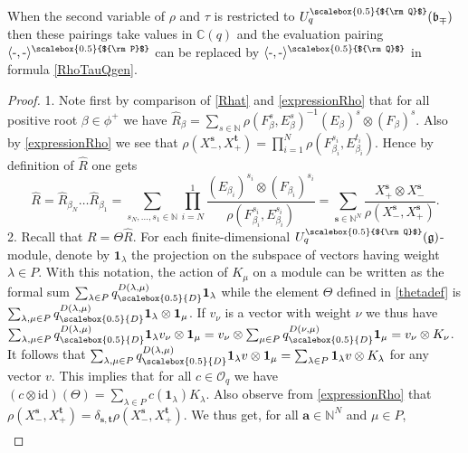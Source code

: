 \documentclass[11pt]{amsart}
\newcommand{\mc}{\mathbb{C}}
\newcommand{\qD}{q_{\scalebox{0.5}{D}}}
\newcommand{\Q}{{\scalebox{0.5}{${\rm Q}$}}}
\newcommand{\Pup}{{\scalebox{0.5}{${\rm P}$}}}
\begin{document}
\noindent When the second variable of $\rho$ and $\tau$ is restricted to $U_q^\Q(\mathfrak b_{\mp})$ then these pairings take values in $\mc(q)$ and the evaluation pairing $\langle\text{-},\text{-}\rangle^\Pup$ can be replaced by $\langle\text{-},\text{-}\rangle^\Q$ in formula \eqref{RhoTauQgen}.
\begin{proof}
1. Note first by comparison of \eqref{Rhat} and \eqref{expressionRho} that for all positive root $\beta \in \phi^+$ we have $\hat{R}_\beta = \textstyle \sum_{s \in \mathbb{N}} \rho(F_\beta^s,E_\beta^s)^{-1} (E_\beta)^s \otimes (F_\beta)^s$. Also by \eqref{expressionRho} we see that $\textstyle \rho(X_-^{\boldsymbol{s}}, X_+^{\boldsymbol{t}}) = \prod_{i=1}^N \rho(F_{\beta_i}^{s_i}, E_{\beta_i}^{t_i})$. Hence by definition of $\hat{R}$ one gets
\[ \hat{R} = \hat{R}_{\beta_N} \ldots \hat{R}_{\beta_1} = \sum_{s_N,\ldots,s_1 \in \mathbb{N}} \prod_{i=N}^1 \frac{(E_{\beta_i})^{s_i} \otimes (F_{\beta_i})^{s_i}}{\rho(F_{\beta_i}^{s_i},E_{\beta_i}^{s_i})} = \sum_{\boldsymbol{s} \in \mathbb{N}^N} \frac{X_+^{\boldsymbol{s}} \otimes X_-^{\boldsymbol{s}}}{\rho(X_-^{\boldsymbol{s}}, X_+^{\boldsymbol{s}})}. \]
2. Recall that $R = \Theta \hat{R}$. For each finite-dimensional $U_q^\Q(\mathfrak{g})$-module, denote by $\boldsymbol{1}_\lambda$ the projection on the subspace of vectors having weight $\lambda \in P$. With this notation, the action of $K_\mu$ on a module can be written as the formal sum $\textstyle \sum_{\lambda \in P} \qD^{D(\lambda,\mu)}\boldsymbol{1}_\lambda$ while the element $\Theta$ defined in \eqref{thetadef} is $\textstyle \sum_{\lambda,\mu \in P} \qD^{D(\lambda,\mu)} \boldsymbol{1}_\lambda \otimes \boldsymbol{1}_\mu$. If $v_\nu$ is a vector with weight $\nu$ we thus have $\textstyle \sum_{\lambda,\mu \in P} \qD^{D(\lambda,\mu)} \boldsymbol{1}_\lambda v_\nu \otimes \boldsymbol{1}_\mu = v_\nu \otimes \sum_{\mu \in P} \qD^{D(\nu,\mu)} \boldsymbol{1}_\mu  = v_\nu \otimes K_\nu$. It follows that $\textstyle \sum_{\lambda,\mu \in P} \qD^{D(\lambda,\mu)} \boldsymbol{1}_\lambda v \otimes \boldsymbol{1}_\mu = \sum_{\lambda \in P} \boldsymbol{1}_\lambda v \otimes K_\lambda$ for any vector $v$. This implies that for all $c \in \mathcal{O}_q$ we have $\textstyle (c \otimes \mathrm{id})(\Theta) = \sum_{\lambda \in P} c(\boldsymbol{1}_\lambda)K_\lambda$. Also observe from \eqref{expressionRho} that $\rho(X_-^{\boldsymbol{s}}, X_+^{\boldsymbol{t}}) = \delta_{\boldsymbol{s},\boldsymbol{t}} \rho(X_-^{\boldsymbol{s}}, X_+^{\boldsymbol{t}})$. We thus get, for all $\boldsymbol{a} \in \mathbb{N}^N$ and $\mu \in P$,
\begin{align*}

\end{align*}
\end{proof}
\end{document}
